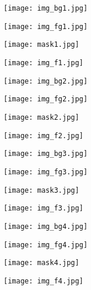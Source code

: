 \begin{figure}[t]
    \centering
    \begin{subfigure}[b]{0.24\textwidth}
        \texttt{[image: img\_bg1.jpg]}
    \end{subfigure}
    \begin{subfigure}[b]{0.24\textwidth}
        \texttt{[image: img\_fg1.jpg]}
    \end{subfigure}
    \begin{subfigure}[b]{0.24\textwidth}
        \texttt{[image: mask1.jpg]}
    \end{subfigure}
    \begin{subfigure}[b]{0.24\textwidth}
        \texttt{[image: img\_f1.jpg]}
    \end{subfigure}
    \begin{subfigure}[b]{0.24\textwidth}
        \texttt{[image: img\_bg2.jpg]}
    \end{subfigure}
    \begin{subfigure}[b]{0.24\textwidth}
        \texttt{[image: img\_fg2.jpg]}
    \end{subfigure}
    \begin{subfigure}[b]{0.24\textwidth}
        \texttt{[image: mask2.jpg]}
    \end{subfigure}
    \begin{subfigure}[b]{0.24\textwidth}
        \texttt{[image: img\_f2.jpg]}
    \end{subfigure}
    \begin{subfigure}[b]{0.24\textwidth}
        \texttt{[image: img\_bg3.jpg]}
    \end{subfigure}
    \begin{subfigure}[b]{0.24\textwidth}
        \texttt{[image: img\_fg3.jpg]}
    \end{subfigure}
    \begin{subfigure}[b]{0.24\textwidth}
        \texttt{[image: mask3.jpg]}
    \end{subfigure}
    \begin{subfigure}[b]{0.24\textwidth}
        \texttt{[image: img\_f3.jpg]}
    \end{subfigure}
    \begin{subfigure}[b]{0.24\textwidth}
        \texttt{[image: img\_bg4.jpg]}
    \end{subfigure}
    \begin{subfigure}[b]{0.24\textwidth}
        \texttt{[image: img\_fg4.jpg]}
    \end{subfigure}
    \begin{subfigure}[b]{0.24\textwidth}
        \texttt{[image: mask4.jpg]}
    \end{subfigure}
    \begin{subfigure}[b]{0.24\textwidth}
        \texttt{[image: img\_f4.jpg]}
    \end{subfigure}


\end{figure}
